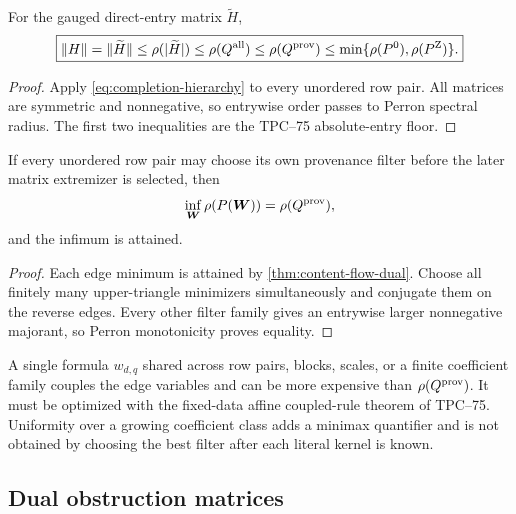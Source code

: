 \begin{theorem}
\label{thm:matrix-hierarchy}
For the gauged direct-entry matrix \(\widetilde H\),
\begin{equation}
 \boxed{
 \|H\|=\|\widetilde H\|
 \le
 \rho(|\widetilde H|)
 \le
 \rho(Q^{\rm all})
 \le
 \rho(Q^{\rm prov})
 \le
 \min\{\rho(P^0),\rho(P^{\rm Z})\}.}
 \label{eq:matrix-hierarchy}
\end{equation}
\end{theorem}

\begin{proof}
Apply \cref{eq:completion-hierarchy} to every unordered row pair.
All matrices are symmetric and nonnegative, so entrywise order passes to
Perron spectral radius.  The first two inequalities are the TPC--75
absolute-entry floor.
\end{proof}

\begin{theorem}
\label{thm:provenance-factorization}
If every unordered row pair may choose its own provenance filter before
the later matrix extremizer is selected, then
\[
 \inf_{\boldsymbol W}
 \rho(P(\boldsymbol W))
 =
 \rho(Q^{\rm prov}),
\]
and the infimum is attained.
\end{theorem}

\begin{proof}
Each edge minimum is attained by
\cref{thm:content-flow-dual}.  Choose all finitely many upper-triangle
minimizers simultaneously and conjugate them on the reverse edges.
Every other filter family gives an entrywise larger nonnegative
majorant, so Perron monotonicity proves equality.
\end{proof}

\begin{remark}
A single formula \(w_{d,q}\) shared across row pairs, blocks, scales, or a
finite coefficient family couples the edge variables and can be more
expensive than \(\rho(Q^{\rm prov})\).  It must be optimized with the
fixed-data affine coupled-rule theorem of TPC--75.  Uniformity over a
growing coefficient class adds a minimax quantifier and is not obtained
by choosing the best filter after each literal kernel is known.
\end{remark}

\subsection{Dual obstruction matrices}


